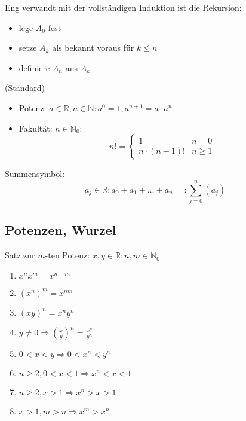 Eng verwandt mit der vollständigen Induktion ist die Rekursion:
\begin{itemize}
 \item lege $A_0$ fest
 \item setze $A_k$ als bekannt voraus für $k \leq n$
 \item definiere $A_n$ aus $A_k$
\end{itemize}

\begin{example} (Standard)
  \begin{itemize}
    \item Potenz: $a \in \mathbb{R}, n \in \mathbb{N}: a^0 = 1, a^{n+1} = a\cdot a^n$
    \item Fakultät: $n \in \mathbb{N}_0:$
    \begin{equation*} n! = \begin{cases} 1 & n = 0 \\ n \cdot (n-1)! & n \geq 1 \end{cases} \end{equation*}
  \end{itemize}
\end{example}

\begin{definition} Summensymbol:
  \begin{equation*} a_j \in \mathbb{R}: a_0 + a_1 + \ldots + a_n =: \sum_{j=0}^{n} \left( a_j \right) \end{equation*}
\end{definition}

\subsection{Potenzen, Wurzel}

\begin{theorem} Satz zur $m$-ten Potenz:
  $x,y \in \mathbb{R}; n,m \in \mathbb{N}_0$
  \begin{enumerate}
   \item $x^nx^m = x^{n+m}$
   \item $(x^n)^m = x^{nm}$
   \item $(xy)^n = x^ny^n$
   \item $y \neq 0 \Rightarrow \left(\frac x y\right)^n = \frac{x^n}{y^n}$
   \item $0 < x < y \Rightarrow 0 < x^n < y^n$
   \item $n \geq 2, 0<x<1 \Rightarrow x^n<x<1$
   \item $n \geq 2, x > 1 \Rightarrow x^n>x>1$
   \item $x > 1, m > n \Rightarrow x^m > x^n$
  \end{enumerate}
  
  
\end{theorem}

